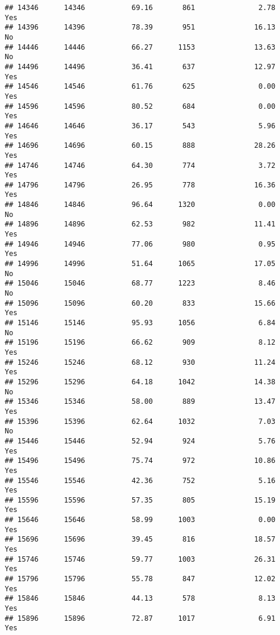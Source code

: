 \documentclass[
]{article}
\begin{document}
\begin{verbatim}
## 14346      14346           69.16       861               2.78               Yes
## 14396      14396           78.39       951              16.13                No
## 14446      14446           66.27      1153              13.63                No
## 14496      14496           36.41       637              12.97               Yes
## 14546      14546           61.76       625               0.00               Yes
## 14596      14596           80.52       684               0.00               Yes
## 14646      14646           36.17       543               5.96               Yes
## 14696      14696           60.15       888              28.26               Yes
## 14746      14746           64.30       774               3.72               Yes
## 14796      14796           26.95       778              16.36               Yes
## 14846      14846           96.64      1320               0.00                No
## 14896      14896           62.53       982              11.41               Yes
## 14946      14946           77.06       980               0.95               Yes
## 14996      14996           51.64      1065              17.05                No
## 15046      15046           68.77      1223               8.46                No
## 15096      15096           60.20       833              15.66               Yes
## 15146      15146           95.93      1056               6.84                No
## 15196      15196           66.62       909               8.12               Yes
## 15246      15246           68.12       930              11.24               Yes
## 15296      15296           64.18      1042              14.38                No
## 15346      15346           58.00       889              13.47               Yes
## 15396      15396           62.64      1032               7.03                No
## 15446      15446           52.94       924               5.76               Yes
## 15496      15496           75.74       972              10.86               Yes
## 15546      15546           42.36       752               5.16               Yes
## 15596      15596           57.35       805              15.19               Yes
## 15646      15646           58.99      1003               0.00               Yes
## 15696      15696           39.45       816              18.57               Yes
## 15746      15746           59.77      1003              26.31               Yes
## 15796      15796           55.78       847              12.02               Yes
## 15846      15846           44.13       578               8.13               Yes
## 15896      15896           72.87      1017               6.91               Yes

\end{verbatim}
\end{document}
